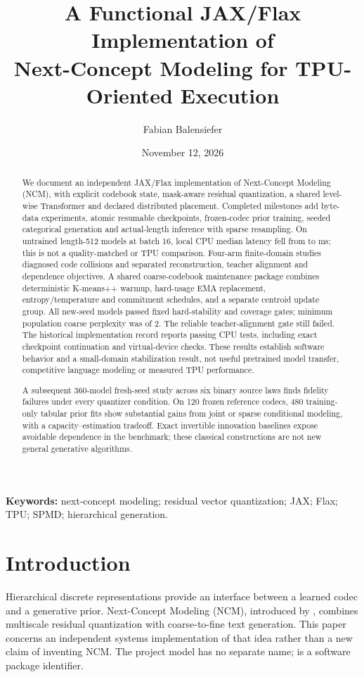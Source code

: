 \documentclass[11pt,a4paper]{article}
\title{A Functional JAX/Flax Implementation of\protect\\
Next-Concept Modeling for TPU-Oriented Execution}
\author{Fabian Balensiefer}
\date{November 12, 2026}
\begin{document}
\maketitle

\begin{abstract}
We document an independent JAX/Flax implementation of Next-Concept Modeling
(NCM), with explicit codebook state, mask-aware residual quantization, a shared
level-wise Transformer and declared distributed placement. Completed milestones
add byte-data experiments, atomic resumable checkpoints, frozen-codec prior
training, seeded categorical generation and actual-length inference with sparse
resampling. On untrained length-512 models at batch 16, local CPU median latency
fell from \PaddedLatency{} to \ActualLatency{} ms; this is not a quality-matched
or TPU comparison. Four-arm finite-domain studies diagnosed code collisions and
separated reconstruction, teacher alignment and dependence objectives. A shared
coarse-codebook maintenance package combines deterministic K-means++ warmup,
hard-usage EMA replacement, entropy/temperature and commitment schedules, and a
separate centroid update group. All \StabilityModels{} new-seed models passed
fixed hard-stability and coverage gates; minimum population coarse perplexity
was \StabilityPP{} of 2. The reliable teacher-alignment gate still failed.
The historical implementation record reports \TestCases{} passing CPU tests, including
exact checkpoint continuation and virtual-device checks. These results establish
software behavior and a small-domain stabilization result, not useful pretrained
model transfer, competitive language modeling or measured TPU performance.

A subsequent 360-model fresh-seed study across six binary source laws finds
fidelity failures under every quantizer condition. On 120 frozen reference
codecs, 480 training-only tabular prior fits show substantial gains from joint
or sparse conditional modeling, with a capacity--estimation tradeoff. Exact
invertible innovation baselines expose avoidable dependence in the benchmark;
these classical constructions are not new general generative algorithms.
\end{abstract}

\noindent\textbf{Keywords:} next-concept modeling; residual vector quantization;
JAX; Flax; TPU; SPMD; hierarchical generation.

\section{Introduction}
Hierarchical discrete representations provide an interface between a learned
codec and a generative prior. Next-Concept Modeling (NCM), introduced by
\citet{kumbong2026ncm}, combines multiscale residual quantization with
coarse-to-fine text generation. This paper concerns an independent systems
implementation of that idea rather than a new claim of inventing NCM. The
project model has no separate name;  is a software package identifier.
\end{document}
